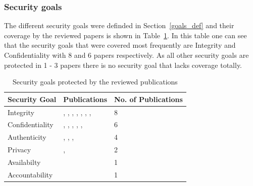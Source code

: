 \documentclass[runningheads]{llncs}
\begin{document}
\subsubsection{Security goals}\label{goals}
The different security goals were definded in Section~\ref{goals_def} and their coverage by the reviewed papers is shown in Table~\ref{goals_table}. In this table one can see that the security goals
that were covered most frequently are Integrity and Confidentiality with 8 and 6 papers respectively. As all other security goals are protected in 1 - 3 papers there is no security
goal that lacks coverage totally.
\begin{table}
    \centering
    \caption{Security goals protected by the reviewed publications}
    \begin{tabular}{ | l | l | l | }
        \hline
        \textbf{Security Goal} & \textbf{Publications}                                                                                                                                                            & \textbf{No. of Publications} \\
        \hline
        \hline
        Integrity              &\cite{Leitner2013719}, \cite{Mardani2013}, \cite{Accorsi20131462}, \cite{Mishra2018613}, \cite{MozafariMehr2022397}, \cite{Breitmayer202411}, \cite{Sarno2020}, \cite{MacAk2020} & 8                            \\
        \hline
        Confidentiality        &\cite{Leitner2013719}, \cite{Accorsi20131462}, \cite{Mishra2018613}, \cite{MozafariMehr2022397}, \cite{Breitmayer202411}, \cite{MacAk2020}                                       & 6                            \\
        \hline
        Authenticity           &\cite{Mardani2013}, \cite{Accorsi20131462}, \cite{Mishra2018613}, \cite{MozafariMehr2022397}                                                                                     & 4                            \\
        \hline
        Privacy                &\cite{Zaman20192982}, \cite{MozafariMehr202182}                                                                                                                                  & 2                            \\
        \hline
        Availabilty            &\cite{Mishra2018613}                                                                                                                                                             & 1                            \\
        \hline
        Accountability         &\cite{Mardani2013}                                                                                                                                                               & 1                            \\
        \hline
    \end{tabular}
    \label{goals_table}
\end{table}
\end{document}
